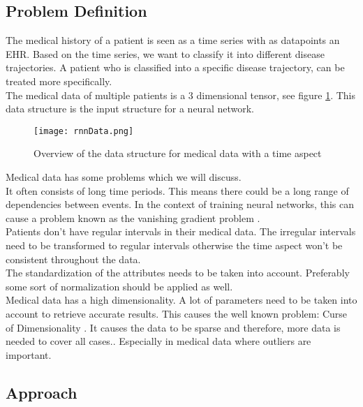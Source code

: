 \subsection{Problem Definition}

The medical history of a patient is seen as a time series with as datapoints an EHR. Based on the time series, we want to classify it into different disease trajectories. A patient who is classified into a specific disease trajectory, can be treated more specifically. \\

The medical data of multiple patients is a $3$ dimensional tensor, see figure \ref{fig:rnnData}. This data structure is the input structure for a neural network.

\begin{figure}[H]
	\centering
	\texttt{[image: rnnData.png]}
	\caption{Overview of the data structure for medical data with a time aspect \cite{dl4jRnn:online}}
	\label{fig:rnnData}
\end{figure} 

Medical data has some problems which we will discuss.\\
It often consists of long time periods. This means there could be a long range of dependencies between events. In the context of training neural networks, this can cause a problem known as the vanishing gradient problem \cite{vanishingproblem:article}. \\
Patients don't have regular intervals in their medical data. The irregular intervals need to be transformed to regular intervals otherwise the time aspect won't be consistent throughout the data. \\
The standardization of the attributes needs to be taken into account. Preferably some sort of normalization should be applied as well. \\
Medical data has a high dimensionality. A lot of parameters need to be taken into account to retrieve accurate results. This causes the well known problem: Curse of Dimensionality \cite {curseofdim:book}. It causes the data to be sparse and therefore, more data is needed to cover all cases.. Especially in medical data where outliers are important. 


\subsection{Approach}

